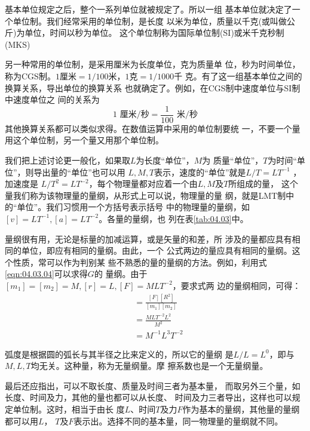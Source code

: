 基本单位规定之后，整个一系列单位就被规定了。所以一组
基本单位就决定了一个单位制。我们经常采用的单位制，是长度
以米为单位，质量以千克(或叫做公斤)为单位，时间以秒为单位。
这个单位制称为国际单位制(SI)或米千克秒制(MKS)

另一种常用的单位制，是采用厘米为长度单位，克为质量单
位，秒为时间单位，称为CGS制。$ 1 $厘米$ =1/100 $米，$ 1 $克$ =1/1000 $千
克。有了这一组基本单位之间的换算关系，导出单位的换算关系
也就确定了。例如，在CGS制中速度单位与SI制中速度单位之
间的关系为
\begin{equation*}
  1 \text{ 厘米/秒} = \frac { 1 } { 1 0 0 } \text{ 米/秒}
\end{equation*}
其他换算关系都可以类似求得。在数值运算中采用的单位制要统
\clearpage\noindent
一，不要一个量用这个单位制，另一个量又用那个单位制。

我们把上述讨论更一般化，如果取$ L $为长度“单位”，$ M $为
质量“单位”，$ T $为时间“单位”，则导出量的“单位”也可以用
$ L , M , T $表示，速度的“单位”就是$ L / T = L T ^ { - 1 } $ ，加速度是
$ L / T ^ { 2 } = L T ^ { - 2 } $，每个物理量都对应着一个由$ L , M $及$ T $所组成的量，
这个量我们称为该物理量的量纲，从形式上可以说，物理量的量
纲，就是LMT制中的“单位”。我们习惯用一个方括号表示括号
中的物理量的量纲，如$ [ v ] = L T ^ { - 1 } , [ a ] = L T ^ { - 2 }$。各量的量纲，也
列在表\ref{tab:04.03}中。

量纲很有用，无论是标量的加减运算，或是矢量的和差，所
涉及的量都应具有相同的单位，即应有相同的量纲。由此，一个
公式两边的量应具有相同的量纲。这个性质，常可以作为判别某
些不熟悉的量的量纲的方法。例如，利用式\eqref{eqn:04.03.04}可以求得$ G $的
量纲。由于$ [ m _ { 1 } ] = [ m _ { 2 } ] = M , [ r ] = L , [ F ] = M L T ^ { - 2 } $，要求式两
边的量纲相同，可得：
\begin{align*}
  [ G ] & = \frac { [ F ] [ R ^ 2] } { [ m _ { 1 } ] [ m _ { 2 } ] } \\
        & = \frac { M L T ^ { - 2 } L ^ { 2 } } { M ^ { 2 } }        \\
        & = M ^ { - 1 } L ^ { 3 } T ^ { - 2 }
\end{align*}

弧度是根据圆的弧长与其半径之比来定义的，所以它的量纲
是$ L / L = L ^ { 0 } $，即与$ M , L , T $均无关。这种量，称为无量纲量。摩
擦系数也是一个无量纲量。

最后还应指出，可以不取长度、质量及时间三者为基本量，
而取另外三个量，如长度、时间及力，其他的量也都可以从长度、
时间及力三者导出，这样也可以规定单位制。这时，相当于由长
度$ L $、时间$ T $及力$ F $作为基本的量纲，其他量的量纲都可以用$ L $，
$ T $及$ F $表示出。选择不同的基本量，同一物理量的量纲就不同。
